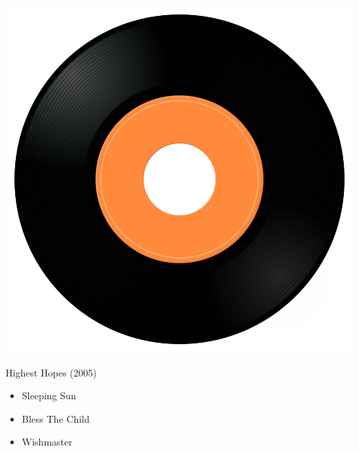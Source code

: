 \begin{minipage}[t]{0.25\textwidth}
\captionsetup{type=figure}
\includegraphics[width=\textwidth]{Images/cover.png}
\caption*{Highest Hopes (2005)}
\end{minipage}
\begin{minipage}[t]{0.25\textwidth}\vspace{0pt}
\begin{itemize}[nosep,leftmargin=1em,labelwidth=*,align=left]
	\setlength{\itemsep}{0pt}
	\item Sleeping Sun
	\item Bless The Child
	\item Wishmaster
\end{itemize}
\end{minipage}
